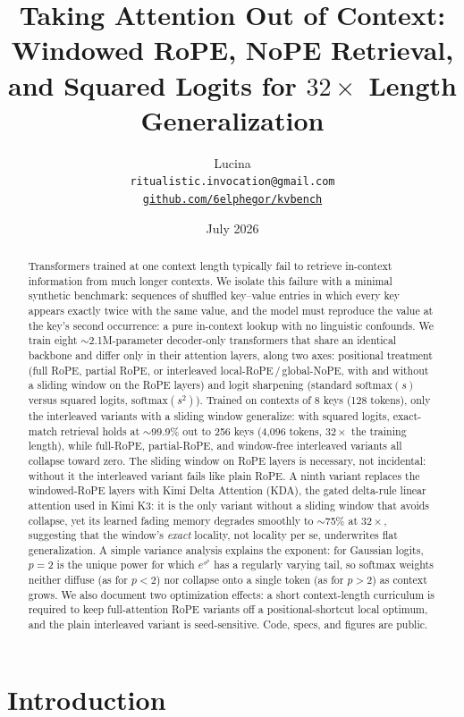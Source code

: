 \documentclass[10pt]{article}
\title{Taking Attention Out of Context: Windowed RoPE, NoPE Retrieval,
and Squared Logits for $32\times$ Length Generalization}
\author{Lucina\\
\texttt{ritualistic.invocation@gmail.com}\\
\href{https://github.com/6elphegor/kvbench}{\texttt{github.com/6elphegor/kvbench}}}
\date{July 2026}
\begin{document}
\maketitle

\begin{abstract}
Transformers trained at one context length typically fail to retrieve
in-context information from much longer contexts. We isolate this failure
with a minimal synthetic benchmark: sequences of shuffled key--value
entries in which every key appears exactly twice with the same value, and
the model must reproduce the value at the key's second occurrence: a pure in-context lookup with no linguistic confounds. We train eight
$\sim$2.1M-parameter decoder-only transformers that share an identical
backbone and differ only in their attention layers, along two axes:
positional treatment (full RoPE, partial RoPE, or interleaved
local-RoPE\,/\,global-NoPE, with and without a sliding window on the RoPE
layers) and logit sharpening (standard $\mathrm{softmax}(s)$ versus
squared logits, $\mathrm{softmax}(s^2)$). Trained on contexts of 8 keys
(128 tokens), only the interleaved variants with a sliding window
generalize: with squared logits, exact-match retrieval holds at
$\sim$99.9\% out to 256 keys (4{,}096 tokens, $32\times$ the training
length), while full-RoPE, partial-RoPE, and window-free interleaved
variants all collapse toward zero. The sliding window on RoPE layers is
necessary, not incidental: without it the interleaved variant fails like
plain RoPE. A ninth variant replaces the windowed-RoPE layers with Kimi
Delta Attention (KDA), the gated delta-rule linear attention used in Kimi
K3: it is the only variant without a sliding window that avoids collapse,
yet its learned fading memory degrades smoothly to $\sim$75\% at
$32\times$, suggesting that the window's \emph{exact} locality, not
locality per se, underwrites flat generalization. A simple variance analysis explains the exponent: for Gaussian
logits, $p=2$ is the unique power for which $e^{s^p}$ has a regularly
varying tail, so softmax weights neither diffuse (as for $p<2$) nor
collapse onto a single token (as for $p>2$) as context grows. We also
document two optimization effects: a short context-length curriculum is
required to keep full-attention RoPE variants off a positional-shortcut
local optimum, and the plain interleaved variant is seed-sensitive.
Code, specs, and figures are public.
\end{abstract}

\section{Introduction}
\end{document}
